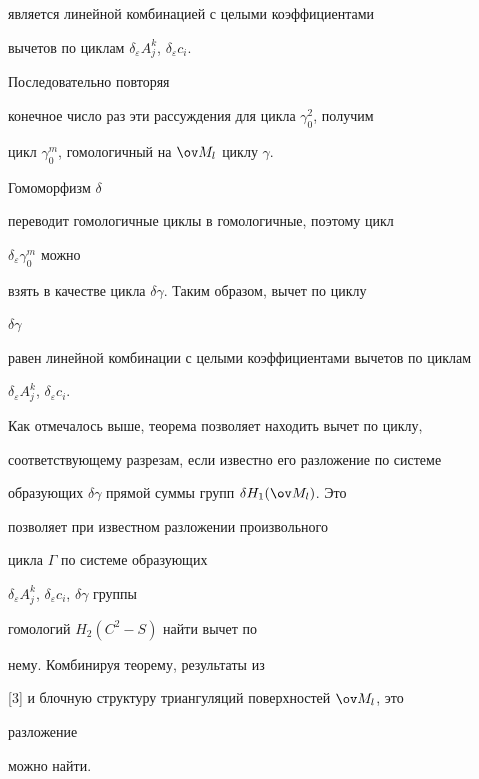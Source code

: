 \begin{pf}
является линейной комбинацией с целыми коэффициентами 


вычетов по циклам $\delta_\varepsilon A^k_j$, $\delta_\varepsilon c_i$. 


Последовательно повторяя 


конечное число раз эти рассуждения для цикла $\gamma^2_0$, получим 


цикл $\gamma^m_0$, гомологичный на $\ov M_l$ циклу $\gamma$.


Гомоморфизм $\delta$ 


переводит гомологичные циклы в гомологичные, поэтому цикл 


$\delta_\varepsilon\gamma^m_0$ можно  


взять в качестве цикла $\delta\gamma$. Таким образом, вычет по циклу 


$\delta\gamma$ 


равен линейной комбинации с целыми коэффициентами вычетов по циклам 


$\delta_\varepsilon A^k_j$, $\delta_\varepsilon c_i$. 


\end{pf} 


 


Как отмечалось выше, теорема позволяет находить вычет по циклу,  


соответствующему разрезам, если известно его разложение по системе 


образующих $\delta\gamma$ прямой суммы групп $\delta H_1(\ov M_l)$. Это 


позволяет при известном разложении произвольного


цикла $\Gamma$ по системе образующих 


$\delta_\varepsilon A^k_j$, $\delta_\varepsilon c_i$, $\delta\gamma$ группы 


гомологий $H_2(C^2-S)$ найти вычет по 


нему. Комбинируя теорему, результаты из 


[3] и блочную структуру триангуляций поверхностей $\ov M_l$, это 


разложение 


можно найти. 


 


 


